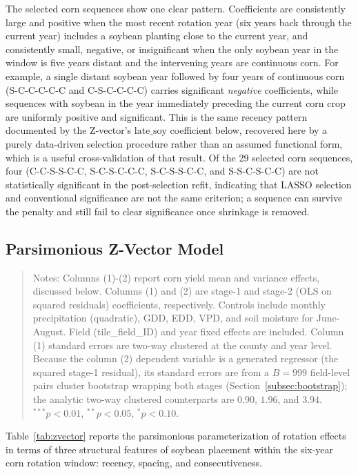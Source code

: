 \documentclass[12pt,letterpaper]{article}
\theoremstyle{remark}
\theoremstyle{remark}
\theoremstyle{plain}
\theoremstyle{definition}
\begin{document}
The selected corn sequences show one clear pattern. Coefficients are consistently large and positive when the most recent rotation year (six years back through the current year) includes a soybean planting close to the current year, and consistently small, negative, or insignificant when the only soybean year in the window is five years distant and the intervening years are continuous corn. For example, a single distant soybean year followed by four years of continuous corn (S-C-C-C-C-C and C-S-C-C-C-C) carries significant \emph{negative} coefficients, while sequences with soybean in the year immediately preceding the current corn crop are uniformly positive and significant. This is the same recency pattern documented by the Z-vector's $\text{late\_soy}$ coefficient below, recovered here by a purely data-driven selection procedure rather than an assumed functional form, which is a useful cross-validation of that result. Of the 29 selected corn sequences, four (C-C-S-S-C-C, S-C-S-C-C-C, S-C-S-S-C-C, and S-S-C-S-C-C) are not statistically significant in the post-selection refit, indicating that LASSO selection and conventional significance are not the same criterion; a sequence can survive the penalty and still fail to clear significance once shrinkage is removed.

\subsection{Parsimonious Z-Vector Model}


\begin{quote}
\small
Notes: Columns (1)-(2) report corn yield mean and variance effects, discussed below. Columns (1) and (2) are stage-1 and stage-2 (OLS on squared residuals) coefficients, respectively. Controls include monthly precipitation (quadratic), GDD, EDD, VPD, and soil moisture for June-August. Field (tile\_field\_ID) and year fixed effects are included. Column (1) standard errors are two-way clustered at the county and year level. Because the column (2) dependent variable is a generated regressor (the squared stage-1 residual), its standard errors are from a $B=999$ field-level pairs cluster bootstrap wrapping both stages (Section~\ref{subsec:bootstrap}); the analytic two-way clustered counterparts are $0.90$, $1.96$, and $3.94$. $^{***}p<0.01$, $^{**}p<0.05$, $^{*}p<0.10$.
\end{quote}
Table~\ref{tab:zvector} reports the parsimonious parameterization of rotation effects in terms of three structural features of soybean placement within the six-year corn rotation window: recency, spacing, and consecutiveness.
\end{document}
